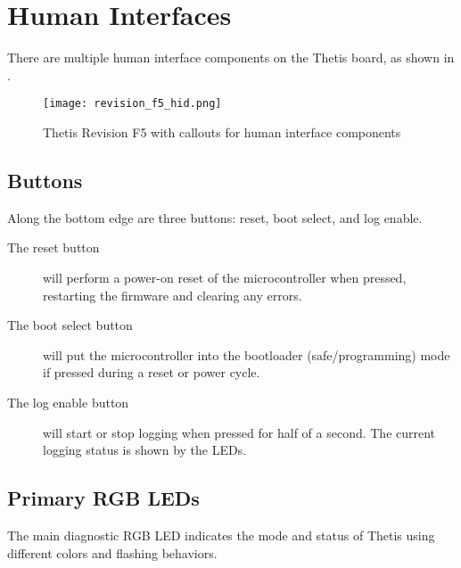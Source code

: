 \section{Human Interfaces}

There are multiple human interface components on the Thetis board, as shown in .

\begin{figure}[h!]
    \centering
    \texttt{[image: revision\_f5\_hid.png]}
    \caption{Thetis Revision F5 with callouts for human interface components}
\end{figure}

\subsection{Buttons}
Along the bottom edge are three buttons: reset, boot select, and log enable.

\begin{description}
    \item[The reset button] will perform a power-on reset of the microcontroller when pressed, restarting the firmware and clearing any errors.
    \item[The boot select button] will put the microcontroller into the bootloader (safe/programming) mode if pressed during a reset or power cycle. 
    \item[The log enable button] will start or stop logging when pressed for half of a second. The current logging status is shown by the LEDs. 
\end{description}

\subsection{Primary \acs{RGB} \acsp{LED}}
\label{sec:led}

The main diagnostic \ac{RGB} \ac{LED} indicates the mode and status of Thetis using different colors and flashing behaviors.

\newcommand{\ledFigure}[3]{
    \begin{figure}[H]
        \centering
        \texttt{[image: LEDs/\#1.png]}
        \caption{#2}
        \label{fig:#3}
    \end{figure}
}

\newcommand{\ledBlinkFigure}[6]{
    \begin{figure}[H]
        \centering
        \subfloat[#2]{\texttt{[image: LEDs/\#1.png]} \label{subfig:#6_#1}} \hskip3ex
        \subfloat[#4]{\texttt{[image: LEDs/\#3.png]} \label{subfig:#6_#2}}
        \caption{#5}
        \label{fig:#6}
    \end{figure}
}

